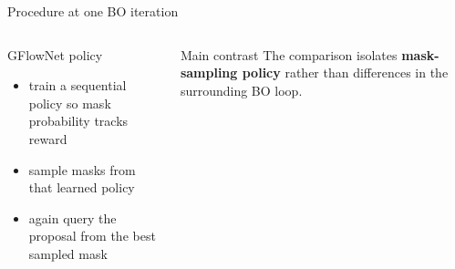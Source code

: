 \documentclass[aspectratio=169]{beamer}
\begin{document}
\begin{frame}{Procedure at one BO iteration}
\begin{columns}[T,onlytextwidth]
\begin{minipage}[t][0.80\textheight]{\linewidth}
  \vfill

  \begin{cardW}{GFlowNet policy}
  \begin{itemize}
    \item train a sequential policy so mask probability tracks reward
    \item sample masks from that learned policy
    \item again query the proposal from the best sampled mask
  \end{itemize}
  \end{cardW}

  \vfill

  \begin{card}{Main contrast}
  The comparison isolates \textbf{mask-sampling policy} rather than differences in the surrounding BO loop.
  \end{card}
\end{minipage}
\end{columns}
\end{frame}
\end{document}
